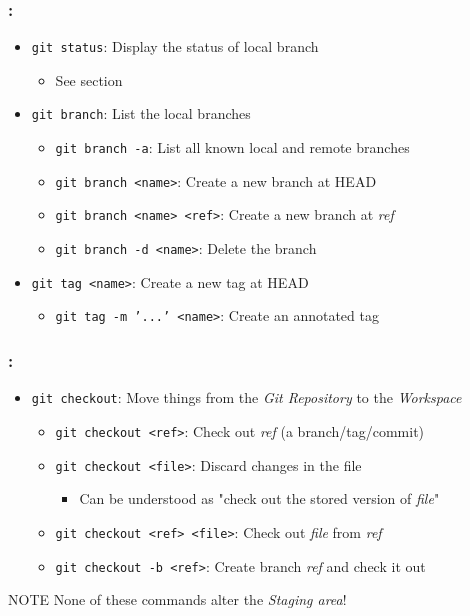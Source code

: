 \begin{frame}
    \frametitle{\secname: \small\subsecname\normalsize}

    \begin{itemize}
        \item \texttt{git status}: Display the status of local branch
        \begin{itemize}
            \item See section 
        \end{itemize}
        \item \texttt{git branch}: List the local branches
        \begin{itemize}
            \item \texttt{git branch -a}: List all known local and remote branches
            \item \texttt{git branch <name>}: Create a new branch at HEAD
            \item \texttt{git branch <name> <ref>}: Create a new branch at \textit{ref}
            \item \texttt{git branch -d <name>}: Delete the branch
        \end{itemize}
        \item \texttt{git tag <name>}: Create a new tag at HEAD
        \begin{itemize}
            \item \texttt{git tag -m '...' <name>}: Create an annotated tag
        \end{itemize}
    \end{itemize}
\end{frame}

\begin{frame}
    \frametitle{\secname: \small\subsecname\normalsize}

    \begin{itemize}
        \item \texttt{git checkout}: Move things from the \textit{Git Repository} to the \textit{Workspace}
        \begin{itemize}
            \item \texttt{git checkout <ref>}: Check out \textit{ref} (a branch/tag/commit)
            \item \texttt{git checkout <file>}: Discard changes in the file
            \begin{itemize}
                \item Can be understood as "check out the stored version of \textit{file}"
            \end{itemize}
            \item \texttt{git checkout <ref> <file>}: Check out \textit{file} from \textit{ref}
            \item \texttt{git checkout -b <ref>}: Create branch \textit{ref} and check it out
        \end{itemize}
    \end{itemize}

    \begin{alertblock}{NOTE}
        None of these commands alter the \textit{Staging area}!
    \end{alertblock}
\end{frame}


